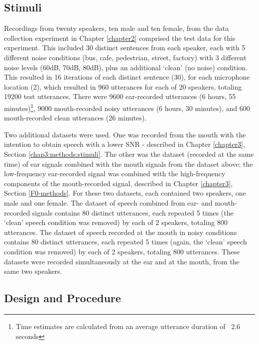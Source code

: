 \subsection{Stimuli}
\label{chap4:methods:stimuli}

Recordings from twenty speakers, ten male and ten female, from the data collection experiment in Chapter \ref{chapter2} comprised the test data for this experiment.  This included 30 distinct sentences from each speaker, each with 5 different noise conditions (bus, cafe, pedestrian, street, factory) with 3 different noise levels (60dB, 70dB, 80dB), plus an additional `clean' (no noise) condition.  This resulted in 16 iterations of each distinct sentence (30), for each microphone location (2), which resulted in 960 utterances for each of 20 speakers, totaling 19200 test utterances.  There were 9600 ear-recorded utterances (6 hours, 55 minutes)\footnote{Time estimates are calculated from an average utterance duration of ~2.6 seconds}, 9000 mouth-recorded noisy utterances (6 hours, 30 minutes), and 600 mouth-recorded clean utterances (26 minutes).

Two additional datasets were used.  One was recorded from the mouth with the intention to obtain speech with a lower SNR - described in Chapter \ref{chapter3}, Section \ref{chap3:methods:stimuli}.  The other was the dataset (recorded at the same time) of ear signals combined with the mouth signals from the dataset above; the low-frequency ear-recorded signal was combined with the high-frequency components of the mouth-recorded signal, described in Chapter \ref{chapter3}, Section \ref{F0-methods}.
For these two datasets, each contained two speakers, one male and one female.  The dataset of speech combined from ear- and mouth-recorded signals contains 80 distinct utterances, each repeated 5 times (the `clean' speech condition was removed) by each of 2 speakers, totaling 800 utterances.  The dataset of speech recorded at the mouth in noisy conditions contains 80 distinct utterances, each repeated 5 times (again, the `clean' speech condition was removed) by each of 2 speakers, totaling 800 utterances.  These datasets were recorded simultaneously at the ear and at the mouth, from the same two speakers.

\subsection{Design and Procedure}
\label{chap4:methods:design}

